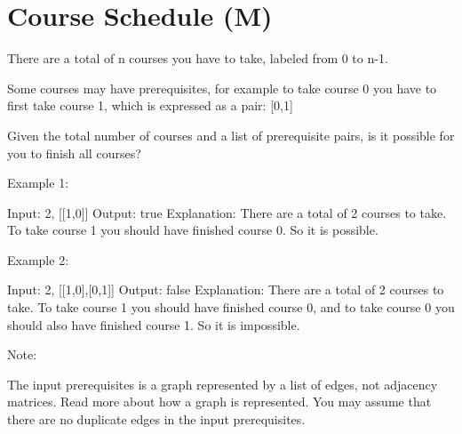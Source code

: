 \section{Course Schedule (M)}
There are a total of n courses you have to take, labeled from 0 to n-1.

Some courses may have prerequisites, for example to take course 0 you have to first take course 1, which is expressed as a pair: [0,1]

Given the total number of courses and a list of prerequisite pairs, is it possible for you to finish all courses?

Example 1:

Input: 2, [[1,0]] 
Output: true
Explanation: There are a total of 2 courses to take. 
             To take course 1 you should have finished course 0. So it is possible.

Example 2:

Input: 2, [[1,0],[0,1]]
Output: false
Explanation: There are a total of 2 courses to take. 
             To take course 1 you should have finished course 0, and to take course 0 you should
             also have finished course 1. So it is impossible.

Note:

    The input prerequisites is a graph represented by a list of edges, not adjacency matrices. Read more about how a graph is represented.
    You may assume that there are no duplicate edges in the input prerequisites.


